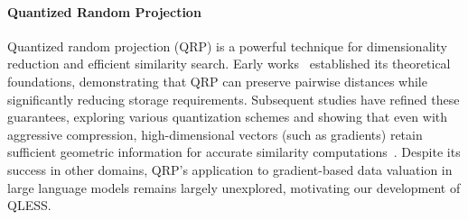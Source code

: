 \paragraph{Quantized Random Projection}  
Quantized random projection (QRP) is a powerful technique for dimensionality reduction and efficient similarity search. Early works~\cite{JLBinaryCoins,QuantizedJL} established its theoretical foundations, demonstrating that QRP can preserve pairwise distances while significantly reducing storage requirements. Subsequent studies have refined these guarantees, exploring various quantization schemes and showing that even with aggressive compression, high-dimensional vectors (such as gradients) retain sufficient geometric information for accurate similarity computations~\cite{VerySparseRP,QRPCosine,QRPGuarantee}. Despite its success in other domains, QRP's application to gradient-based data valuation in large language models remains largely unexplored, motivating our development of QLESS.